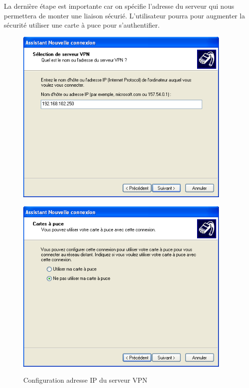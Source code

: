 La dernière étape est importante car on spécifie l'adresse du serveur qui nous permettera de monter une liaison sécurié. L'utilisateur pourra pour augmenter la sécurité utiliser une carte à puce pour s'authentifier.

\begin{figure}[H]
	\begin{minipage}{0.5\textwidth}
		\begin{flushleft} \large
			\includegraphics[width=0.95\textwidth]{partie_2/screen_windows/etape5.PNG}\\
		\end{flushleft}
	\end{minipage}
	\begin{minipage}{0.5\textwidth}
		\begin{flushright} \large
			\includegraphics[width=0.95\textwidth]{partie_2/screen_windows/etape6.PNG}\\
		\end{flushright}
	\end{minipage}
	\caption{Configuration adresse IP du serveur VPN}
	\label{VPN_ETAPE3}
\end{figure}

